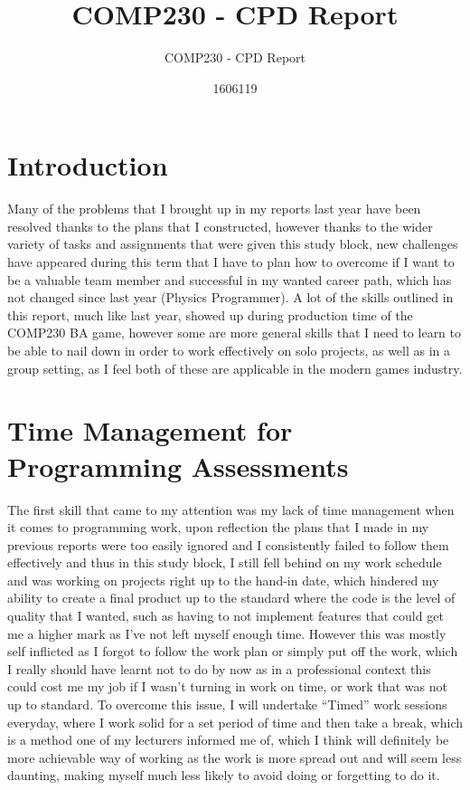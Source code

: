 \documentclass{scrartcl}
\title{COMP230 - CPD Report}
\subtitle{COMP230 - CPD Report}
\author{1606119}
\begin{document}
\maketitle

\section{Introduction}
Many of the problems that I brought up in my reports last year have been resolved thanks to the plans that I constructed, however thanks to the wider variety of tasks and assignments that were given this study block, new challenges have appeared during this term that I have to plan how to overcome if I want to be a valuable team member and successful in my wanted career path, which has not changed since last year (Physics Programmer). A lot of the skills outlined in this report, much like last year, showed up during production time of the COMP230 BA game, however some are more general skills that I need to learn to be able to nail down in order to work effectively on solo projects, as well as in a group setting, as I feel both of these are applicable in the modern games industry. 


\section{Time Management for Programming Assessments}
The first skill that came to my attention was my lack of time management when it comes to programming work, upon reflection the plans that I made in my previous reports were too easily ignored and I consistently failed to follow them effectively and thus in this study block, I still fell behind on my work schedule and was working on projects right up to the hand-in date, which hindered my ability to create a final product up to the standard where the code is the level of quality that I wanted, such as having to not implement features that could get me a higher mark as I've not left myself enough time. However this was mostly self inflicted as I forgot to follow the work plan or simply put off the work, which I really should have learnt not to do by now as in a professional context this could cost me my job if I wasn't turning in work on time, or work that was not up to standard. To overcome this issue, I will undertake ``Timed'' work sessions everyday, where I work solid for a set period of time and then take a break, which is a method one of my lecturers informed me of, which I think will definitely be more achievable way of working as the work is more spread out and will seem less daunting, making myself much less likely to avoid doing or forgetting to do it. 
\end{document}
